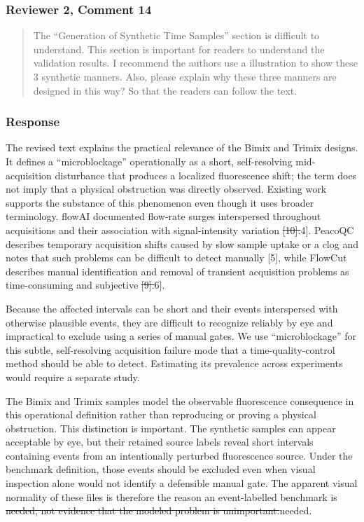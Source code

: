 \documentclass[
  11pt,
  a4paper,
]{article}
\begin{document}
\subsubsection{Reviewer 2, Comment 14}\label{reviewer-2-comment-14}

\begin{quote}
The ``Generation of Synthetic Time Samples'' section is difficult to
understand. This section is important for readers to understand the
validation results. I recommend the authors use a illustration to show
these 3 synthetic manners. Also, please explain why these three manners
are designed in this way? So that the readers can follow the text.
\end{quote}

\subsubsection{Response}\label{response-8}

The revised text explains the practical relevance of the Bimix and
Trimix designs. It defines a ``microblockage'' operationally as a short,
self-resolving mid-acquisition disturbance that produces a localized
fluorescence shift; the term does not imply that a physical obstruction
was directly observed. Existing work supports the substance of this
phenomenon even though it uses broader terminology. flowAI documented
flow-rate surges interspersed throughout acquisitions and their
association with signal-intensity variation
{\color{revisionred}\sout{{[}10{]}.}}{\color{revisionblue}{[}4{]}.}
PeacoQC describes temporary acquisition shifts caused by slow sample
uptake or a clog and notes that such problems can be difficult to detect
manually {[}5{]}, while FlowCut describes manual identification and
removal of transient acquisition problems as time-consuming and
subjective
{\color{revisionred}\sout{{[}9{]}.}}{\color{revisionblue}{[}6{]}.}

Because the affected intervals can be short and their events
interspersed with otherwise plausible events, they are difficult to
recognize reliably by eye and impractical to exclude using a series of
manual gates. We use ``microblockage'' for this subtle, self-resolving
acquisition failure mode that a time-quality-control method should be
able to detect. Estimating its prevalence across experiments would
require a separate study.

The Bimix and Trimix samples model the observable fluorescence
consequence in this operational definition rather than reproducing or
proving a physical obstruction. This distinction is important. The
synthetic samples can appear acceptable by eye, but their retained
source labels reveal short intervals containing events from an
intentionally perturbed fluorescence source. Under the benchmark
definition, those events should be excluded even when visual inspection
alone would not identify a defensible manual gate. The apparent visual
normality of these files is therefore the reason an event-labelled
benchmark is {\color{revisionred}\sout{needed, not evidence that the
modeled problem is unimportant.}}{\color{revisionblue}needed.}
\end{document}
